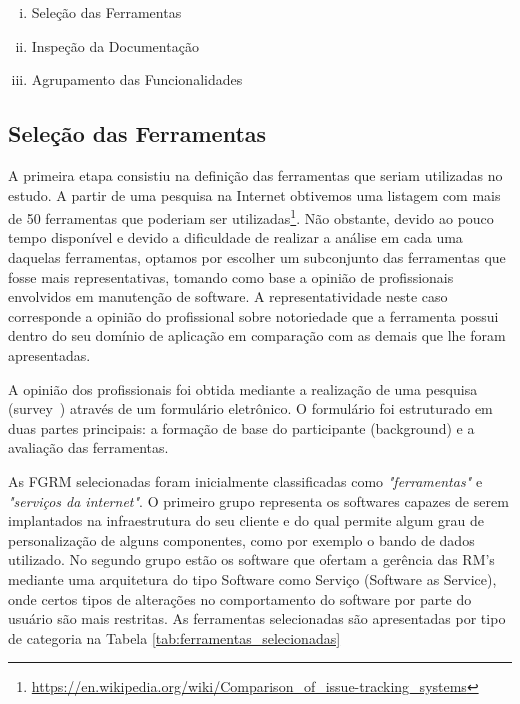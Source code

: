 \begin{enumerate}[(i)]
	\item Seleção das Ferramentas
	\item Inspeção da Documentação
	\item Agrupamento das Funcionalidades
\end{enumerate}

\subsection{Seleção das Ferramentas}
\label{ssub:Seleção das Ferramentas}

A primeira etapa consistiu na definição das ferramentas que seriam utilizadas no
estudo. A partir de uma pesquisa na Internet obtivemos uma listagem com
mais de 50 ferramentas que poderiam ser
utilizadas\footnote{\url{https://en.wikipedia.org/wiki/Comparison_of_issue-tracking_systems}}.
Não obstante, devido ao pouco tempo disponível e devido a dificuldade de
realizar a análise em cada uma daquelas ferramentas, optamos por escolher um
subconjunto das ferramentas que fosse mais representativas, tomando como base a
opinião de profissionais envolvidos em manutenção de software. A
representatividade neste caso corresponde a opinião do profissional sobre
notoriedade que a ferramenta possui dentro do seu domínio de aplicação em
comparação com as demais que lhe foram apresentadas.

A opinião dos profissionais foi obtida mediante a realização de uma pesquisa
(survey~\cite{wohlin2012experimentation}) através de um formulário eletrônico.
O formulário foi estruturado em duas partes principais: a formação de
base do participante (background) e a avaliação das ferramentas. 

As FGRM selecionadas foram inicialmente classificadas como
\textit{"ferramentas"} e \textit{"serviços da internet"}. O primeiro grupo
representa os softwares capazes de serem implantados na infraestrutura do seu
cliente e do qual permite algum grau de personalização de alguns componentes,
como por exemplo o bando de dados utilizado. No segundo grupo estão os software
que ofertam a gerência das RM's mediante uma arquitetura do tipo Software como
Serviço (Software as Service), onde certos tipos de alterações no comportamento
do software por parte do usuário são mais restritas. As ferramentas selecionadas
são apresentadas por tipo de categoria na Tabela
\ref{tab:ferramentas_selecionadas} 

